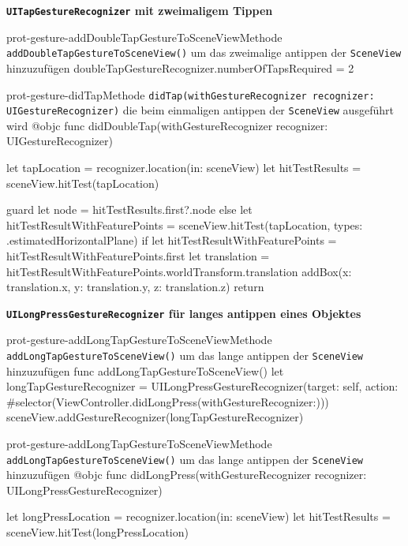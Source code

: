 \begin{description}
    \textbf{\texttt{UITapGestureRecognizer} mit zweimaligem Tippen}\\

    \begin{code}{prot-gesture-addDoubleTapGestureToSceneView}{Methode \texttt{addDoubleTapGestureToSceneView()} um das zweimalige antippen der \texttt{SceneView} hinzuzufügen}
    doubleTapGestureRecognizer.numberOfTapsRequired = 2
    \end{code}

    \begin{code}{prot-gesture-didTap}{Methode \texttt{didTap(withGestureRecognizer recognizer: UIGestureRecognizer)} die beim einmaligen antippen der \texttt{SceneView} ausgeführt wird}
    @objc
    func didDoubleTap(withGestureRecognizer recognizer: UIGestureRecognizer) {
        let tapLocation = recognizer.location(in: sceneView)
        let hitTestResults = sceneView.hitTest(tapLocation)
        
        guard let node = hitTestResults.first?.node else {
            let hitTestResultWithFeaturePoints = sceneView.hitTest(tapLocation, types: .estimatedHorizontalPlane)
            if let hitTestResultWithFeaturePoints = hitTestResultWithFeaturePoints.first {
                let translation = hitTestResultWithFeaturePoints.worldTransform.translation
                addBox(x: translation.x, y: translation.y, z: translation.z)
            }
            return
        }
    }
    \end{code}

    \textbf{\texttt{UILongPressGestureRecognizer} für langes antippen eines Objektes}\\

    \begin{code}{prot-gesture-addLongTapGestureToSceneView}{Methode \texttt{addLongTapGestureToSceneView()} um das lange antippen der \texttt{SceneView} hinzuzufügen}
    func addLongTapGestureToSceneView() {
        let longTapGestureRecognizer = UILongPressGestureRecognizer(target: self, action: #selector(ViewController.didLongPress(withGestureRecognizer:)))
        sceneView.addGestureRecognizer(longTapGestureRecognizer)
    }
    \end{code}

    \begin{code}{prot-gesture-addLongTapGestureToSceneView}{Methode \texttt{addLongTapGestureToSceneView()} um das lange antippen der \texttt{SceneView} hinzuzufügen}
    @objc
    func didLongPress(withGestureRecognizer recognizer: UILongPressGestureRecognizer) {
        let longPressLocation = recognizer.location(in: sceneView)
        let hitTestResults = sceneView.hitTest(longPressLocation)
        
}
\end{code}
\end{description}
